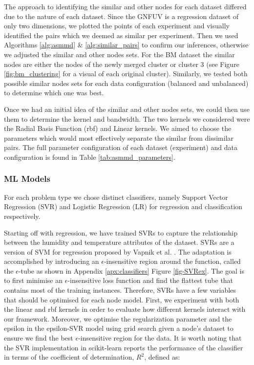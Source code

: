 \documentclass{mpaper}
\begin{document}
The approach to identifying the similar and other nodes for each dataset differed due to the nature of each dataset. Since the GNFUV is a regression dataset of only two dimensions, we plotted the points of each experiment and visually identified the pairs which we deemed as similar per experiment. Then we used Algorithms \ref{alg:asmmd} \& \ref{alg:similar_pairs} to confirm our inferences, otherwise we adjusted the similar and other nodes sets. For the BM dataset the similar nodes are either the nodes of the newly merged cluster or cluster 3 (see Figure \ref{fig:bm_clustering} for a visual of each original cluster). Similarly, we tested both possible similar nodes sets for each data configuration (balanced and unbalanced) to determine which one was best. 

Once we had an initial idea of the similar and other nodes sets, we could then use them to determine the kernel and bandwidth.  The two kernels we considered were the Radial Basis Function (rbf) and Linear kernels. We aimed to choose the parameters which would most effectively separate the similar from dissimilar pairs. The full parameter configuration of each dataset (experiment) and data configuration is found in Table \ref{tab:asmmd_parameters}.


\subsubsection{ML Models}

For each problem type we chose distinct classifiers, namely Support Vector Regression (SVR) and Logistic Regression (LR) for regression and classification respectively.

Starting off with regression, we have trained SVRs to capture the relationship between the humidity and temperature attributes of the dataset. SVRs are a version of SVM for regression proposed by Vapnik et al. \cite{OriginalSVR}. The adaptation is accomplished by introducing an $\epsilon$-insensitive region around the function, called the $\epsilon$-tube as shown in Appendix \ref{apx:classifiers} Figure \ref{fig-SVRex}. The goal is to first minimise an $\epsilon$-insensitive loss function and find the flattest tube that contains most of the training instances. Therefore, SVRs have a few variables that should be optimised for each node model. First, we experiment with both the linear and rbf kernels in order to evaluate how different kernels interact with our framework. Moreover, we optimise the regularization parameter and the epsilon in the epsilon-SVR model using grid search given a node's dataset to ensure we find the best $\epsilon$-insensitive region for the data. It is worth noting that the SVR implementation in scikit-learn reports the performance of the classifier in terms of the coefficient of determination, $R^2$, defined as:
\end{document}
